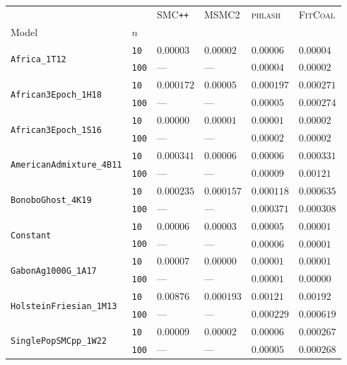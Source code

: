 \documentclass{article}
\begin{document}
\begin{footnotesize}
\begin{tabular}{llllll}
\toprule
 &  & \textsc{SMC}\texttt{{++}} & \textsc{MSMC2} & \textsc{phlash} & \textsc{FitCoal} \\
Model & $n$ &  &  &  &  \\
\midrule
\multirow[c]{2}{*}{\texttt{Africa\_1T12}} & \texttt{10} & $0.00003$ & $0.00002$ & $0.00006$ & $0.00004$ \\
 & \texttt{100} & --- & --- & $0.00004$ & $0.00002$ \\
\cline{1-6}
\multirow[c]{2}{*}{\texttt{African3Epoch\_1H18}} & \texttt{10} & $0.000172$ & $0.00005$ & $0.000197$ & $0.000271$ \\
 & \texttt{100} & --- & --- & $0.00005$ & $0.000274$ \\
\cline{1-6}
\multirow[c]{2}{*}{\texttt{African3Epoch\_1S16}} & \texttt{10} & $0.00000$ & $0.00001$ & $0.00001$ & $0.00002$ \\
 & \texttt{100} & --- & --- & $0.00002$ & $0.00002$ \\
\cline{1-6}
\multirow[c]{2}{*}{\texttt{AmericanAdmixture\_4B11}} & \texttt{10} & $0.000341$ & $0.00006$ & $0.00006$ & $0.000331$ \\
 & \texttt{100} & --- & --- & $0.00009$ & $0.00121$ \\
\cline{1-6}
\multirow[c]{2}{*}{\texttt{BonoboGhost\_4K19}} & \texttt{10} & $0.000235$ & $0.000157$ & $0.000118$ & $0.000635$ \\
 & \texttt{100} & --- & --- & $0.000371$ & $0.000308$ \\
\cline{1-6}
\multirow[c]{2}{*}{\texttt{Constant}} & \texttt{10} & $0.00006$ & $0.00003$ & $0.00005$ & $0.00001$ \\
 & \texttt{100} & --- & --- & $0.00006$ & $0.00001$ \\
\cline{1-6}
\multirow[c]{2}{*}{\texttt{GabonAg1000G\_1A17}} & \texttt{10} & $0.00007$ & $0.00000$ & $0.00001$ & $0.00001$ \\
 & \texttt{100} & --- & --- & $0.00001$ & $0.00000$ \\
\cline{1-6}
\multirow[c]{2}{*}{\texttt{HolsteinFriesian\_1M13}} & \texttt{10} & $0.00876$ & $0.000193$ & $0.00121$ & $0.00192$ \\
 & \texttt{100} & --- & --- & $0.000229$ & $0.000619$ \\
\cline{1-6}
\multirow[c]{2}{*}{\texttt{SinglePopSMCpp\_1W22}} & \texttt{10} & $0.00009$ & $0.00002$ & $0.00006$ & $0.000267$ \\
 & \texttt{100} & --- & --- & $0.00005$ & $0.000268$ \\

\end{tabular}
\end{footnotesize}
\end{document}
